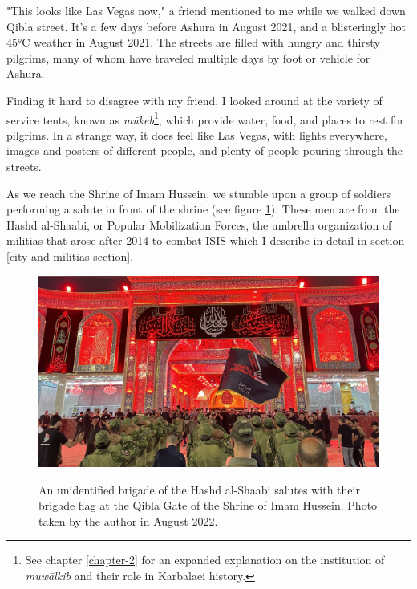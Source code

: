 "This looks like Las Vegas now," a friend mentioned to me while we walked down Qibla street. It's a few days before Ashura in August 2021, and a blisteringly hot 45°C weather in August 2021. The streets are filled with hungry and thirsty pilgrims, many of whom have traveled multiple days by foot or vehicle for Ashura. 

Finding it hard to disagree with my friend, I looked around at the variety of service tents, known as \emph{mūkeb}\footnote{See chapter \ref{chapter-2} for an expanded explanation on the institution of \emph{muwālkib} and their role in Karbalaei history.}, which provide water, food, and places to rest for pilgrims. In a strange way, it does feel like Las Vegas, with lights everywhere, images and posters of different people, and plenty of people pouring through the streets. 


As we reach the Shrine of Imam Hussein, we stumble upon a group of soldiers performing a salute in front of the shrine (see figure \ref{fig:hashd-salute}). These men are from the Hashd al-Shaabi, or Popular Mobilization Forces, the umbrella organization of militias that arose after 2014 to combat ISIS which I describe in detail in section \ref{city-and-militias-section}. 

\begin{figure}
\caption{An unidentified brigade of the Hashd al-Shaabi salutes with their brigade flag at the Qibla Gate of the Shrine of Imam Hussein. Photo taken by the author in August 2022.}\centering
\includegraphics[width=.75\textwidth]{images/hashd-salutes.jpeg}
\label{fig:hashd-salute}
\end{figure}

